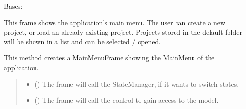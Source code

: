 \documentclass[letterpaper,10pt,english]{sphinxmanual}
\begin{document}
\begin{fulllineitems}
\label{\detokenize{apidoc/src.osm_configurator.view.toplevelframes:src.osm_configurator.view.toplevelframes.main_menu_frame.MainMenuFrame}}
\pysigstartsignatures
{}
\pysigstopsignatures
\sphinxAtStartPar
Bases: {\hyperref[\detokenize{apidoc/src.osm_configurator.view.toplevelframes:src.osm_configurator.view.toplevelframes.top_level_frame.TopLevelFrame}]{}}

\sphinxAtStartPar
This frame shows the application’s main menu.
The user can create a new project, or load an already existing project. Projects stored in the default folder
will be shown in a list and can be selected / opened.

\begin{fulllineitems}
\label{\detokenize{apidoc/src.osm_configurator.view.toplevelframes:src.osm_configurator.view.toplevelframes.main_menu_frame.MainMenuFrame.__init__}}
\pysigstartsignatures
{}
\pysigstopsignatures
\sphinxAtStartPar
This method creates a MainMenuFrame showing the MainMenu of the application.
\begin{quote}\begin{description}
\begin{itemize}
\item {} 
\sphinxAtStartPar
{} ({\hyperref[\detokenize{apidoc/src.osm_configurator.view.states:src.osm_configurator.view.states.state_manager.StateManager}]{}}) \textendash{} The frame will call the StateManager, if it wants to switch states.

\item {} 
\sphinxAtStartPar
{} ({\hyperref[\detokenize{apidoc/src.osm_configurator.control:src.osm_configurator.control.control_interface.IControl}]{}}) \textendash{} The frame will call the control to gain access to the model.


\end{itemize}
\end{description}
\end{quote}
\end{fulllineitems}
\end{fulllineitems}
\end{document}
